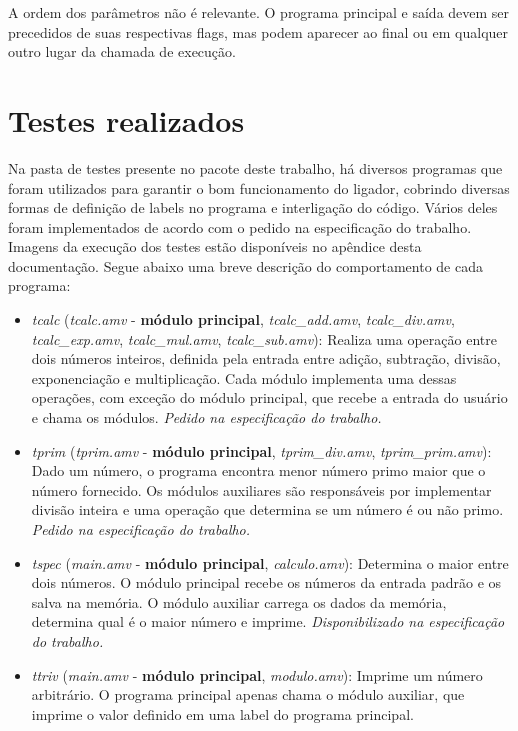 \documentclass[12pt,a4paper]{article}
\numberwithin{equation}{section}
\begin{document}
A ordem dos parâmetros não é relevante. O programa principal e saída devem ser precedidos de suas respectivas flags, mas podem aparecer ao final ou em qualquer outro lugar da chamada de execução.

\section{Testes realizados}

Na pasta de testes presente no pacote deste trabalho, há diversos programas que foram utilizados para garantir o bom funcionamento do ligador, cobrindo diversas formas de definição de labels no programa e interligação do código. Vários deles foram implementados de acordo com o pedido na especificação do trabalho. Imagens da execução dos testes estão disponíveis no apêndice desta documentação. Segue abaixo uma breve descrição do comportamento de cada programa:

\begin{itemize}
    \item \emph{tcalc} (\emph{tcalc.amv} - \textbf{módulo principal}, \emph{tcalc\_add.amv}, \emph{tcalc\_div.amv}, \emph{tcalc\_exp.amv}, \emph{tcalc\_mul.amv}, \emph{tcalc\_sub.amv}): Realiza uma operação entre dois números inteiros, definida pela entrada entre adição, subtração, divisão, exponenciação e multiplicação. Cada módulo implementa uma dessas operações, com exceção do módulo principal, que recebe a entrada do usuário e chama os módulos. \emph{Pedido na especificação do trabalho.}
    \item \emph{tprim} (\emph{tprim.amv} - \textbf{módulo principal}, \emph{tprim\_div.amv}, \emph{tprim\_prim.amv}): Dado um número, o programa encontra menor número primo maior que o número fornecido. Os módulos auxiliares são responsáveis por implementar divisão inteira e uma operação que determina se um número é ou não primo. \emph{Pedido na especificação do trabalho.}
    \item \emph{tspec} (\emph{main.amv} - \textbf{módulo principal}, \emph{calculo.amv}): Determina o maior entre dois números. O módulo principal recebe os números da entrada padrão e os salva na memória. O módulo auxiliar carrega os dados da memória, determina qual é o maior número e imprime. \emph{Disponibilizado na especificação do trabalho.}
    \item \emph{ttriv} (\emph{main.amv} - \textbf{módulo principal}, \emph{modulo.amv}): Imprime um número arbitrário. O programa principal apenas chama o módulo auxiliar, que imprime o valor definido em uma label do programa principal.
\end{itemize}
\end{document}
